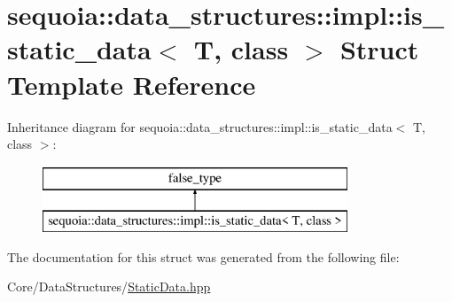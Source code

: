 \hypertarget{structsequoia_1_1data__structures_1_1impl_1_1is__static__data}{}\section{sequoia\+::data\+\_\+structures\+::impl\+::is\+\_\+static\+\_\+data$<$ T, class $>$ Struct Template Reference}
\label{structsequoia_1_1data__structures_1_1impl_1_1is__static__data}
Inheritance diagram for sequoia\+::data\+\_\+structures\+::impl\+::is\+\_\+static\+\_\+data$<$ T, class $>$\+:\begin{figure}[H]
\begin{center}
\leavevmode
\includegraphics[height=2.000000cm]{structsequoia_1_1data__structures_1_1impl_1_1is__static__data}
\end{center}
\end{figure}


The documentation for this struct was generated from the following file\+:\begin{DoxyCompactItemize}
\item 
Core/\+Data\+Structures/\mbox{\hyperlink{_static_data_8hpp}{Static\+Data.\+hpp}}\end{DoxyCompactItemize}

